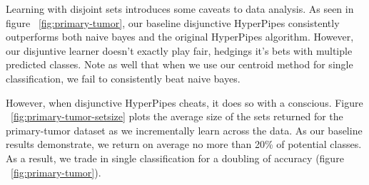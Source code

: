 \begin{figure*}
\centering
{}
\caption{Incremental results from a discrete dataset with 22 class values}
\label{fig:primary-tumor}
\end{figure*}

\begin{figure*}
\centering
{}
\caption{Average number of classes contained within disjunction for incremental learning}
\label{fig:primary-tumor-setsize}
\end{figure*}

\begin{figure*}
\centering
{}
\caption{Incremental results from a numeric dataset with 7 discrete classes}
\label{fig:segment}
\end{figure*}

\begin{figure*}
\centering
{}
\caption{Average number of classes contained within disjunction for numeric attribute dataset}
\label{fig:segment-setsize}
\end{figure*}

Learning with disjoint sets introduces some caveats to data analysis. As seen in figure ~\ref{fig:primary-tumor}, our baseline disjunctive HyperPipes consistently outperforms both naive bayes and the original HyperPipes algorithm. However, our disjuntive learner doesn't exactly play fair, hedgings it's bets with multiple predicted classes. Note as well that when we use our centroid method for single classification, we fail to consistently beat naive bayes.

However, when disjunctive HyperPipes cheats, it does so with a conscious. Figure ~\ref{fig:primary-tumor-setsize} plots the average size of the sets returned for the primary-tumor dataset as we incrementally learn across the data. As our baseline results demonstrate, we return on average no more than 20\% of potential classes. As a result, we trade in single classification for a doubling of accuracy (figure ~\ref{fig:primary-tumor}).
